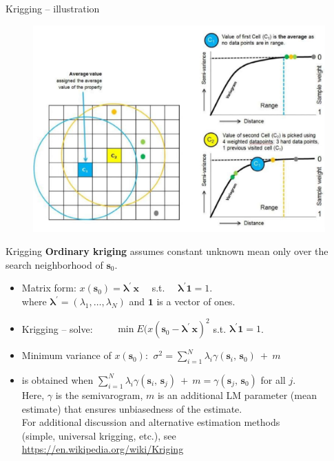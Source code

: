 \documentclass{beamer}
\begin{document}
\begin{frame}{Krigging -- illustration}
\begin{figure}
	\includegraphics[width=.8\textwidth]{IMG/sp_Krigg.pdf}
\end{figure}
\end{frame}
\begin{frame}{Krigging}
\textbf{Ordinary kriging} assumes constant unknown mean only over the search neighborhood of $\bm{s}_{0}$. \\ \medskip
\begin{itemize}
    \item Matrix form: $x(\bm{s}_0)= \bm{\lambda}^{\prime} \, \bm{x}$ ~~s.t.~~ $\bm{\lambda}^{\prime} \bm{1} = 1$. \\
    where $\bm{\lambda}^{\prime} = (\lambda_1,\dots,\lambda_N)$ and $\bm{1}$ is a vector of ones.
    \medskip
    \item Krigging -- solve:~~~~ $\min E(x(\bm{s}_0 - \bm{\lambda}^{\prime} \, \bm{x})^2$ s.t. $\bm{\lambda}^{\prime} \bm{1} = 1$.\\
    \medskip
    \item  Minimum variance of $x(\bm{s}_0)$: $~\sigma^2= \sum_{i=1}^N \lambda_i \gamma (\bm{s}_i,\,\bm{s}_0)~+~m \,$
    \medskip
    \item is obtained when $\sum_{i=1}^N \lambda_i \gamma (\bm{s}_i,\,\bm{s}_j)~+~m = \gamma (\bm{s}_j,\,\bm{s}_0)$ for all $j$. \\
    \medskip
    Here, $\gamma$ is the semivarogram, $m$ is an additional LM parameter (mean estimate) that ensures unbiasedness of the estimate. \\For additional discussion and alternative estimation methods \\(simple, universal krigging, etc.), see\\
    \url{https://en.wikipedia.org/wiki/Kriging}
\end{itemize}
\end{frame}
\end{document}
